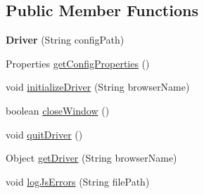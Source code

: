 \subsection*{Public Member Functions}
\begin{DoxyCompactItemize}
\item 
\hypertarget{classcom_1_1zeuslearning_1_1automation_1_1selenium_1_1driver_1_1Driver_ab3e3c0cd9969a64ae62ec049b387536b}{}\label{classcom_1_1zeuslearning_1_1automation_1_1selenium_1_1driver_1_1Driver_ab3e3c0cd9969a64ae62ec049b387536b} 
{\bfseries Driver} (String config\+Path)
\item 
Properties \hyperlink{classcom_1_1zeuslearning_1_1automation_1_1selenium_1_1driver_1_1Driver_aa9b92da3b234318fa721d62da577debf}{get\+Config\+Properties} ()
\item 
void \hyperlink{classcom_1_1zeuslearning_1_1automation_1_1selenium_1_1driver_1_1Driver_a5a80edeb2ead34ac5d92f331a1f59388}{initialize\+Driver} (String browser\+Name)
\item 
boolean \hyperlink{classcom_1_1zeuslearning_1_1automation_1_1selenium_1_1driver_1_1Driver_ac81edc32c4c0c5173723161f93b5d9a0}{close\+Window} ()
\item 
void \hyperlink{classcom_1_1zeuslearning_1_1automation_1_1selenium_1_1driver_1_1Driver_aa185026e032362e2cbfa14b583cf7d48}{quit\+Driver} ()
\item 
Object \hyperlink{classcom_1_1zeuslearning_1_1automation_1_1selenium_1_1driver_1_1Driver_acf213a93d95506c1aa26b4e1b4154183}{get\+Driver} (String browser\+Name)
\item 
void \hyperlink{classcom_1_1zeuslearning_1_1automation_1_1selenium_1_1driver_1_1Driver_a5e4cf6f7ea41db7d15f35aaa1052bd0f}{log\+Js\+Errors} (String file\+Path)
\end{DoxyCompactItemize}
